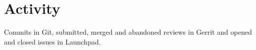 \section{Activity}
Commits in Git, submitted, merged and abandoned reviews in Gerrit and opened and closed issues in Launchpad.
